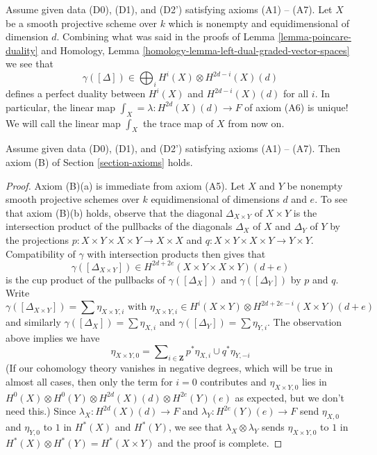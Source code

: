 \begin{remark}
\label{remark-trace}
Assume given data (D0), (D1), and (D2') satisfying axioms (A1) -- (A7).
Let $X$ be a smooth projective scheme over $k$ which is nonempty
and equidimensional of dimension $d$. Combining what was said in
the proofs of Lemma \ref{lemma-poincare-duality} and
Homology, Lemma \ref{homology-lemma-left-dual-graded-vector-spaces}
we see that
$$
\gamma([\Delta]) \in \bigoplus\nolimits_i H^i(X) \otimes H^{2d - i}(X)(d)
$$
defines a perfect duality between $H^i(X)$ and $H^{2d - i}(X)(d)$
for all $i$.
In particular, the linear map $\int_X = \lambda : H^{2d}(X)(d) \to F$ of
axiom (A6) is unique! We will call the linear map $\int_X$ the trace map
of $X$ from now on.
\end{remark}

\begin{lemma}
\label{lemma-trace-product}
Assume given data (D0), (D1), and (D2') satisfying axioms (A1) -- (A7).
Then axiom (B) of Section \ref{section-axioms} holds.
\end{lemma}

\begin{proof}
Axiom (B)(a) is immediate from axiom (A5).
Let $X$ and $Y$ be nonempty smooth projective schemes over $k$
equidimensional of dimensions $d$ and $e$. To see that axiom (B)(b)
holds, observe that the diagonal $\Delta_{X \times Y}$ of $X \times Y$
is the intersection product of the pullbacks of the diagonals
$\Delta_X$ of $X$ and $\Delta_Y$ of $Y$ by the projections
$p : X \times Y \times X \times Y \to X \times X$ and
$q : X \times Y \times X \times Y \to Y \times Y$.
Compatibility of $\gamma$ with intersection products then gives
that
$$
\gamma([\Delta_{X \times Y}]) \in
H^{2d + 2e}(X \times Y \times X \times Y)(d + e)
$$
is the cup product of the pullbacks of $\gamma([\Delta_X])$
and $\gamma([\Delta_Y])$ by $p$ and $q$. Write
$$
\gamma([\Delta_{X \times Y}]) = \sum \eta_{X \times Y, i}
\text{ with }
\eta_{X \times Y, i} \in
H^i(X \times Y) \otimes H^{2d + 2e - i}(X \times Y)(d + e)
$$
and similarly $\gamma([\Delta_X]) = \sum \eta_{X, i}$ and
$\gamma([\Delta_Y]) = \sum \eta_{Y, i}$. The observation above
implies we have
$$
\eta_{X \times Y, 0} =
\sum\nolimits_{i \in \mathbf{Z}} p^*\eta_{X, i} \cup q^*\eta_{Y, -i}
$$
(If our cohomology theory vanishes in negative degrees, which will
be true in almost all cases, then only the term for $i = 0$ contributes
and $\eta_{X \times Y, 0}$ lies in
$H^0(X) \otimes H^0(Y) \otimes H^{2d}(X)(d) \otimes H^{2e}(Y)(e)$ as expected,
but we don't need this.) Since $\lambda_X : H^{2d}(X)(d) \to F$ and 
$\lambda_Y : H^{2e}(Y)(e) \to F$ send $\eta_{X, 0}$ and $\eta_{Y, 0}$
to $1$ in $H^*(X)$ and $H^*(Y)$, we see that $\lambda_X \otimes \lambda_Y$
sends $\eta_{X \times Y, 0}$ to $1$ in
$H^*(X) \otimes H^*(Y) = H^*(X \times Y)$ and the proof is complete.
\end{proof}


